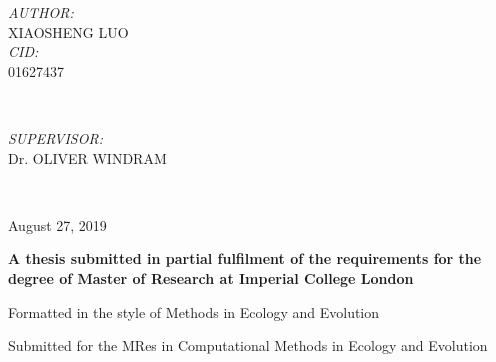 \begin{titlepage}
    \begin{minipage}{0.4\textwidth}
    \begin{flushleft} \large
    \emph{AUTHOR:}\\
    XIAOSHENG \textsc{LUO} \\ %
    \emph{CID:}\\
    01627437
    \end{flushleft}
    \end{minipage}
    ~
    \begin{minipage}{0.5\textwidth}
    \begin{flushright} \large
    \emph{SUPERVISOR:} \\
    Dr. OLIVER \textsc{WINDRAM} \\[0.5cm] %
    \end{flushright}
    \end{minipage}\\[1cm]

    \begin{center}
    {\large August 27, 2019}\\[0.5cm] %
    \vspace{1cm}

    {\normalsize \bf {A thesis submitted in partial fulfilment of the requirements for the degree of Master of Research at Imperial College London}}

    {\normalsize {Formatted in the style of Methods in Ecology and Evolution}}

    {\normalsize {Submitted for the MRes in Computational Methods in Ecology and Evolution}}
    
    \end{center}

\end{titlepage}
    
    